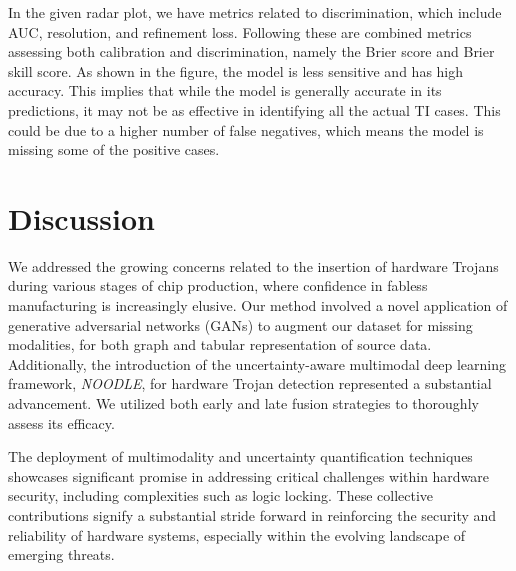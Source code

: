 In the given radar plot, we have metrics related to discrimination, which include AUC, resolution, and refinement loss. Following these are combined metrics assessing both calibration and discrimination, namely the Brier score and Brier skill score. As shown in the figure, the model is less sensitive and has high accuracy. This implies that while the model is generally accurate in its predictions, it may not be as effective in identifying all the actual TI cases. This could be due to a higher number of false negatives, which means the model is missing some of the positive cases.

\section*{Discussion}


We addressed the growing concerns related to the insertion of hardware Trojans during various stages of chip production, where confidence in fabless manufacturing is increasingly elusive. Our method involved a novel application of generative adversarial networks (GANs) to augment our dataset for missing modalities, for both graph and tabular representation of source data. Additionally, the introduction of the uncertainty-aware multimodal deep learning framework, \textit{NOODLE}, for hardware Trojan detection represented a substantial advancement. We utilized both early and late fusion strategies to thoroughly assess its efficacy. 

The deployment of multimodality and uncertainty quantification techniques showcases significant promise in addressing critical challenges within hardware security, including complexities such as logic locking. These collective contributions signify a substantial stride forward in reinforcing the security and reliability of hardware systems, especially within the evolving landscape of emerging threats.


\endgroup